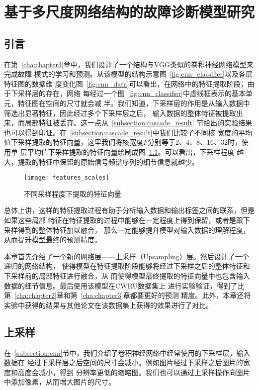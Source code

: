 \chapter{基于多尺度网络结构的故障诊断模型研究}
\label{cha:chapter4}

\section{引言}

在第~\ref{cha:chapter3}章中，我们设计了一个结构与VGG类似的卷积神经网络模型来完成故障
模式的学习和预测。从该模型的结构示意图~\ref{fig:cnn_classifier}以及各层特征图的数据维
度变化图~\ref{fig:cnn_data}可以看出，在网络中的特征提取阶段，由于下采样层的存在，网络
每经过一个图~\ref{fig:cnn_classifier}中虚线框表示的基本单元，特征图在空间的尺寸就会减
半。我们知道，下采样层的作用是从输入数据中筛选出显著特征，因此经过多个下采样层之后，
输入数据的整体特征被提取出来，而局部特征被丢弃。这一点从~\ref{subsection:cascade_result}
节给出的实验结果也可以得到印证。在~\ref{subsection:cascade_result}中我们比较了不同核
宽度的平均值下采样提取的特征向量，这里我们将核宽度$F$分别等于2、4、8、16、32时，使用单
层平均值下采样提取的特征向量绘制成图~\ref{fig:features_scales}。可以看出，下采样程度
越大，提取的特征中保留的原始信号频谱序列的细节信息就越少。
\begin{figure}[ht]
  \centering
  \texttt{[image: features\_scales]}
  \caption{不同采样程度下提取的特征向量}
  \label{fig:features_scales}
\end{figure}

总体上讲，这样的特征提取过程有助于分析输入数据和输出标签之间的联系，但是如果这些局部
特征在特征提取的过程中能够在一定程度上得到保留，或者是跟下采样得到的整体特征加以融合，
那么一定能够提升模型对输入数据的理解程度，从而提升模型最终的预测精度。

本章首先介绍了一个新的网络层——上采样（Upsampling）层。然后设计了一个递归的网络结构，
使得模型在特征提取阶段能够将经过下采样之后的整体特征和下采样前的局部特征进行融合，从
而使得模型最终提取的特征向量中也包含输入数据的细节信息。最后使用该模型在CWRU数据集上
进行实验验证，得到了比第~\ref{cha:chapter2}章和第~\ref{cha:chapter3}章都要更好的预测
精度。此外，本章还将实验中获得的结果与其他论文在该数据集上获得的效果进行了对比。

\section{上采样}

在~\ref{subsection:cnn}节中，我们介绍了卷积神经网络中经常使用的下采样层，输入数据在
经过下采样层之后空间的尺寸会减小。例如图片经过下采样之后图片的宽度和高度会减小，得到
分辨率更低的缩略图。我们也可以通过上采样操作向图片中添加像素，从而增大图片的尺寸。

